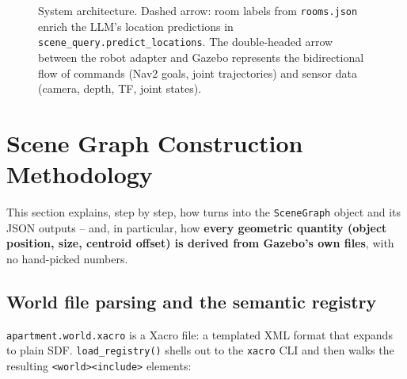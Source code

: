 \documentclass[11pt]{article}
\begin{document}
\begin{figure}[H]
{%
}
\caption{System architecture. Dashed arrow: room labels from
\texttt{rooms.json} enrich the LLM's location predictions in
\texttt{scene\_query.predict\_locations}. The double-headed arrow between the
robot adapter and Gazebo represents the bidirectional flow of commands
(Nav2 goals, joint trajectories) and sensor data (camera, depth, TF, joint
states).}
\label{fig:architecture}
\end{figure}

\section{Scene Graph Construction Methodology}
\label{sec:scenegraph}

This section explains, step by step, how
 turns
 into the \texttt{SceneGraph} object and its JSON
outputs -- and, in particular, how \textbf{every geometric quantity (object
position, size, centroid offset) is derived from Gazebo's own files}, with
no hand-picked numbers.

\subsection{World file parsing and the semantic registry}
\label{sec:worldparse}

\texttt{apartment.world.xacro} is a Xacro file: a templated XML format that
expands to plain SDF. \texttt{load\_registry()} shells out to the
\texttt{xacro} CLI and then walks the resulting \texttt{<world><include>}
elements:
\end{document}
